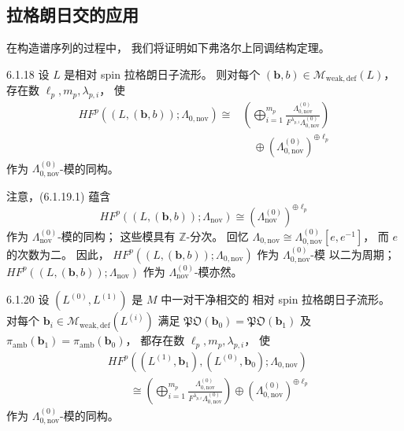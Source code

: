 
\subsection{拉格朗日交的应用}
\label{subsec:6-1-3}

在构造谱序列的过程中，
我们将证明如下弗洛尔上同调结构定理。

\begin{theorem}{6.1.18}\label{thm:6-1-18}
设 $L$ 是相对 spin 拉格朗日子流形。
则对每个
$(\boldsymbol b,b)\in
\mathcal M_{\mathrm{weak,def}}(L)$，
存在数 $\ell_p,m_p,\lambda_{p,i}$，
使
\begin{equation}
\begin{aligned}
HF^p((L,(\boldsymbol b,b));
\Lambda_{0,\mathrm{nov}})
\cong{}&
\left(
\bigoplus_{i=1}^{m_p}
\frac{\Lambda_{0,\mathrm{nov}}^{(0)}}
{F^{\lambda_{p,i}}
\Lambda_{0,\mathrm{nov}}^{(0)}}
\right)\\
&\quad\oplus
(\Lambda_{0,\mathrm{nov}}^{(0)})^{\oplus\ell_p}
\end{aligned}
\tag{6.1.19.1}\label{eq:6-1-19-1}
\end{equation}
作为 $\Lambda_{0,\mathrm{nov}}^{(0)}$-模的同构。
\end{theorem}

注意，(6.1.19.1) 蕴含
\begin{equation}
HF^p((L,(\boldsymbol b,b));
\Lambda_{\mathrm{nov}})
\cong
(\Lambda_{\mathrm{nov}}^{(0)})^{\oplus\ell_p}
\tag{6.1.19.2}\label{eq:6-1-19-2}
\end{equation}
作为 $\Lambda_{\mathrm{nov}}^{(0)}$-模的同构；
这些模具有 $\mathbb Z$-分次。
回忆
$\Lambda_{0,\mathrm{nov}}
\cong\Lambda_{0,\mathrm{nov}}^{(0)}[e,e^{-1}]$，
而 $e$ 的次数为二。
因此，
$HF^p((L,(\boldsymbol b,b));
\Lambda_{0,\mathrm{nov}})$
作为 $\Lambda_{0,\mathrm{nov}}^{(0)}$-模
以二为周期；
$HF^p((L,(\boldsymbol b,b));
\Lambda_{\mathrm{nov}})$
作为 $\Lambda_{\mathrm{nov}}^{(0)}$-模亦然。

\begin{theorem}{6.1.20}\label{thm:6-1-20}
设 $(L^{(0)},L^{(1)})$
是 $M$ 中一对干净相交的
相对 spin 拉格朗日子流形。
对每个
$\mathbf b_i\in
\mathcal M_{\mathrm{weak,def}}(L^{(i)})$
满足
$\mathfrak{PO}(\mathbf b_0)
=\mathfrak{PO}(\mathbf b_1)$ 及
$\pi_{\mathrm{amb}}(\mathbf b_1)
=\pi_{\mathrm{amb}}(\mathbf b_0)$，
都存在数 $\ell_p,m_p,\lambda_{p,i}$，
使
\begin{equation}
\begin{aligned}
&HF^p((L^{(1)},\mathbf b_1),
(L^{(0)},\mathbf b_0);
\Lambda_{0,\mathrm{nov}})\\
&\qquad\cong
\left(
\bigoplus_{i=1}^{m_p}
\frac{\Lambda_{0,\mathrm{nov}}^{(0)}}
{F^{\lambda_{p,i}}
\Lambda_{0,\mathrm{nov}}^{(0)}}
\right)
\oplus
(\Lambda_{0,\mathrm{nov}}^{(0)})^{\oplus\ell_p}
\end{aligned}
\tag{6.1.21.1}\label{eq:6-1-21-1}
\end{equation}
作为 $\Lambda_{0,\mathrm{nov}}^{(0)}$-模的同构。
\end{theorem}

